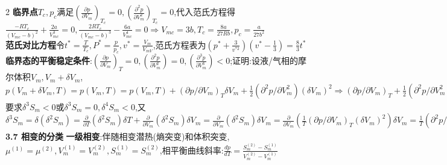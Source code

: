 \documentclass[10pt,a4paper]{article}
\begin{document}
\begin{multicols}{2}
\textbf{临界点}$T_c,p_c$满足$\left(\frac{\partial p}{\partial V_m}\right)_{T_c}=0,\left(\frac{\partial^2p}{\partial V_m^2}\right)_{T_c}=0$,代入范氏方程得$\frac{-RT_c}{(V_{mc}-b)^2}+\frac{2a}{V_{mc}^3}=0,\frac{2RT_c}{(V_{mc}-b)^3}-\frac{6a}{V_{mc}^4}=0\Rightarrow V_{mc}=3b,T_c=\frac{8a}{27Rb},p_c=\frac{a}{27b^2}$\\
\textbf{范氏对比方程}令$t^*=\frac{T}{T_c},P^*=\frac{p}{p_c},v^*=\frac{V_m}{V_{mV}}$,范氏方程表为$(p^*+\frac{3}{v^{*2}})(v^*-\frac{1}{3})=\frac{8}{3}t^*$\\
\textbf{临界态的平衡稳定条件}:$\left(\frac{\partial p}{\partial V_m}\right)_T=0,\left(\frac{\partial^2p}{\partial V_m^2}\right)=0,\left(\frac{\partial^3p}{\partial V_m^3}\right)<0$;证明:设液/气相的摩尔体积$V_m,V_m+\delta V_m$,$p(V_m+\delta V_m,T)=p(V_m,T)=p(V_m,T)+({\partial p}/{\partial V_m})_T\delta V_m+\frac{1}{2}({\partial^2p}/{\partial V_m^2})(\delta V_m)^2\Rightarrow({\partial p}/{\partial V_m})_T+\frac{1}{2}({\partial^2p}/{\partial V_m^2})_T\delta V_m=0,\because\delta V_m\rightarrow0\therefore({\partial p}/{\partial V_m})_T=0,\Delta S=\delta S_m+\delta^2S_m/2+\delta^3S_m/3!+\delta^4S_m/4!+\cdots,\delta^2S=-({C_{V,m}}/{T^2})(\delta T)^2+\frac{1}{T}({\partial p}/{\partial V_m})_T(\delta V_m)^2,\because\delta T=0,\therefore\delta^2S_m=0,\therefore$要求$\delta^3S_m<0$或$\delta^3S_m=0,\delta^4S_m<0$,又$\delta^3S_m=\delta(\delta^2S_m)=\frac{\partial}{\partial T}(\delta^2S_m)\delta T+\frac{\partial}{\partial V_m}(\delta^2S_m)\delta V_m=\frac{\partial}{\partial V_m}(\delta^2S_m)\delta V_m=\frac{\partial}{\partial V_m}(\frac{1}{T}({\partial p}/{\partial V_m})_T(\delta V_m)^2)\delta V_m=\frac{1}{T}({\partial^2p}/{\partial V_m^2})_T(\delta V_m)^3,\because\delta V_m=\text{arb},\therefore({\partial^2p}/{\partial V_m^2})_T=0\Rightarrow\delta^3S_m=0,\delta^4S_m=\delta(\delta^3S_m)=\frac{1}{T}({\partial^3p}/{\partial V_m^3})_T(\delta V_m)^4<0\Rightarrow({\partial^3p}/{\partial V_m^3})_T<0$\\
\textbf{3.7 相变的分类}
\textbf{一级相变}:伴随相变潜热(熵突变)和体积突变,$\mu^{(1)}=\mu^{(2)},V_m^{(1)}=V_m^{(2)},S_m^{(1)}=S_m^{(2)}$,相平衡曲线斜率:$\frac{dp}{dT}=\frac{S_m^{(2)}-S_m^{(1)}}{V_m^{(2)}-V_m^{(1)}}$\quad

\end{multicols}
\end{document}
